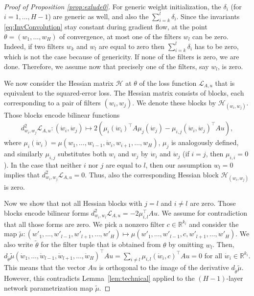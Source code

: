 \documentclass[twoside]{article}
\theoremstyle{definition}
\theoremstyle{remark}
\begin{document}
\begin{proof}[Proof of Proposition \ref{prop:exlude0}]
    For generic weight initialization, the $\delta_i$ (for $i = 1, \ldots, H-1$) are generic as well, and also the $\sum_{i=k}^{l} \delta_i$.
    Since the invariants \eqref{eq:InvConvolution} stay constant during gradient flow, at the point $\theta = (w_1, \ldots, w_H)$ of convergence, at most one of the filters $w_l$ can be zero. Indeed, if two filters $w_k$ and $w_l$ are equal to zero then $\sum_{i=k}^{l} \delta_i$ has to be zero, which is not the case because of genericity. 
    If none of the filters is zero, we are done. 
    Therefore, we assume now that precisely one of the filters, say $w_l$, is zero.

    We now consider the Hessian matrix $\mathcal{H}$ at $\theta$ of the loss function $\mathcal{L}_{A,u}$ that is equivalent to the squared-error loss.
    The Hessian matrix consists of blocks, each corresponding to a pair of filters $(w_i,w_j)$.
    We denote these blocks by $\mathcal{H}_{(w_i,w_j)}$.
    Those blocks encode bilinear functions 
    \begin{align*}
        d^2_{w_i,w_j} \mathcal{L}_{A,u}: (\dot w_i, \dot w_j) \mapsto 
        2 \left( \mu_i(\dot w_i)^\top A \mu_j (\dot w_j) - \mu_{i,j}(\dot w_i, \dot w_j)^\top A u \right),
    \end{align*}
    where $\mu_i(\dot w_i) = \mu(w_1, \ldots, w_{i-1}, \dot w_i, w_{i+1}, \ldots, w_H)$, $\mu_j$ is analogously defined, and similarly $\mu_{i,j}$ substitutes both $w_i$ and $w_j$ by $\dot w_i$ and $\dot w_j$ (if $i=j$, then $\mu_{i,i}=0$).
    In the case that neither $i$ nor $j$ are equal to $l$, then our assumption $w_l=0$ implies that $d^2_{w_i,w_j} \mathcal{L}_{A,u}=0$. Thus, also the corresponding Hessian block $\mathcal{H}_{(w_i,w_j)}$ is zero. 

    Now we show that not all Hessian blocks with $j=l$ and $i \neq l$ are zero. 
    Those blocks encode bilinear forms  $d^2_{w_i,w_l} \mathcal{L}_{A,u} = -2 \mu_{i,l}^\top Au$. 
    We assume for contradiction that all those forms are zero.
    We pick a nonzero filter $c \in \mathbb{R}^{k_l}$ and consider the map $\tilde{\mu}: (w'_1, \ldots, w'_{l-1}, w'_{l+1}, \ldots, w'_H) \mapsto \mu(w'_1, \ldots, w'_{l-1}, c, w'_{l+1}, \ldots, w'_H)$.
    We also write $\tilde{\theta}$ for the filter tuple that is obtained from $\theta$ by omitting $w_l$.
    Then, $d_{\tilde{\theta}} \tilde{\mu}
    (\dot w_1, \ldots, \dot w_{l-1}, \dot w_{l+1}, \ldots, \dot w_H)^\top Au =   \sum_{i \neq l} \mu_{i,l}(\dot w_i,c)^\top Au = 0$ for all $\dot w_i \in \mathbb{R}^{k_i}$.
    This means that the vector $Au$ is orthogonal to the image of the derivative $d_{\tilde{\theta}} \tilde{\mu}$.
    However, this contradicts Lemma~\ref{lem:technical} applied to the $(H-1)$-layer network parametrization map $\tilde{\mu}$.


\end{proof}
\end{document}
